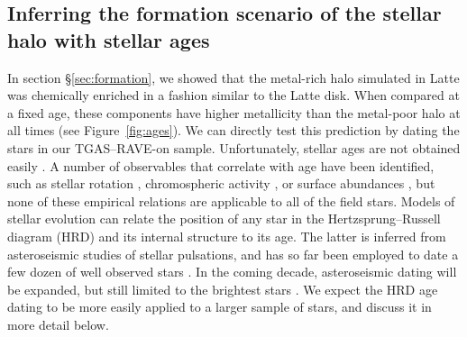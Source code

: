 \documentclass[apj, twocolappendix, numberedappendix, appendixfloats]{emulateapj}
\begin{document}
\subsection{Inferring the formation scenario of the stellar halo with stellar ages}
\label{sec:ages}
In section \S\ref{sec:formation}, we showed that the metal-rich halo simulated in Latte was chemically enriched in a fashion similar to the Latte disk.
When compared at a fixed age, these components have higher metallicity than the metal-poor halo at all times (see Figure~\ref{fig:ages}).
We can directly test this prediction by dating the stars in our TGAS--RAVE-on sample.
Unfortunately, stellar ages are not obtained easily \citep[for a recent review, see][]{soderblom2010}.
A number of observables that correlate with age have been identified, such as stellar rotation \citep{barnes2007}, chromospheric activity \citep{mamajek2008}, or surface abundances \citep{ness2016}, but none of these empirical relations are applicable to all of the field stars.
Models of stellar evolution can relate the position of any star in the Hertzsprung--Russell diagram (HRD) and its internal structure to its age.
The latter is inferred from asteroseismic studies of stellar pulsations, and has so far been employed to date a few dozen of well observed stars \citep[e.g.,][]{keplerages}.
In the coming decade, asteroseismic dating will be expanded, but still limited to the brightest stars \citep{tess, plato}.
We expect the HRD age dating to be more easily applied to a larger sample of stars, and discuss it in more detail below.
\end{document}
